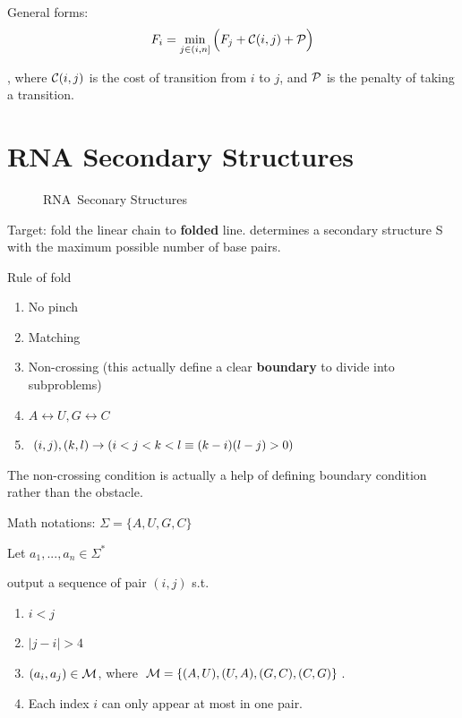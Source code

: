 \documentclass[a4paper]{report}
\theoremstyle{definition}
\begin{document}
General forms:
$$
F_i = \min_{j\in(i,n]}\Big(F_j+\mathcal{C}(i, j)+\mathcal{P}\Big)
$$

, where $\mathcal{C}(i, j)$ is the cost of transition from $i$ to $j$, and $\mathcal{P}$ is the penalty of taking a transition.

\section{RNA Secondary Structures}
\begin{figure}[!htp]
\centering
{}
\caption{RNA\ Seconary Structures}
\label{fig:rna}
\end{figure}

Target: fold the linear chain to \textbf{folded} line. determines a secondary structure S with the maximum possible number of base pairs.

Rule of fold
\begin{enumerate}
\item No pinch
\item Matching
\item Non-crossing (this actually define a clear \textbf{boundary} to divide into subproblems)
\item $A \leftrightarrow U, G \leftrightarrow C$
\item $(i, j), (k,l) \rightarrow (i<j<k<l \equiv (k-i)(l-j)>0)$
\end{enumerate}
The non-crossing condition is actually a help of defining boundary condition rather than the obstacle.

Math notations:
$\Sigma=\{A, U, G, C\}$

Let $a_1, ..., a_n\in \Sigma^*$

output a sequence of pair $(i, j)$ s.t.
\begin{enumerate}
\item $i<j$
\item $|j-i| > 4$
\item $(a_i, a_j)\in \mathcal{M}$, where $\mathcal{M}= \{(A, U), (U, A), (G, C), (C, G)\}$.
\item Each index $i$ can only appear at most in one pair.
\end{enumerate}
\end{document}
